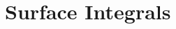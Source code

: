 \newpage

\section[Day 6: Surface Integrals]{ Surface Integrals }





















































